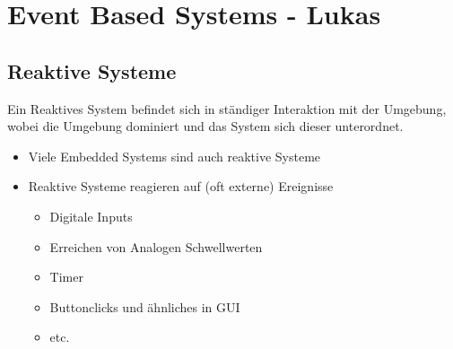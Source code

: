 \section{Event Based Systems - Lukas }
\subsection{Reaktive Systeme }
Ein Reaktives System befindet sich in ständiger Interaktion mit der Umgebung, wobei die Umgebung dominiert und das System sich dieser unterordnet.
\begin{itemize}
	\item Viele Embedded Systems sind auch reaktive Systeme
	\item Reaktive Systeme reagieren auf (oft externe) Ereignisse
	\begin{itemize}
	\item Digitale Inputs
	\item Erreichen von Analogen Schwellwerten
	\item Timer
	\item Buttonclicks und ähnliches in GUI
	\item etc.
	\end{itemize}
\end{itemize}

